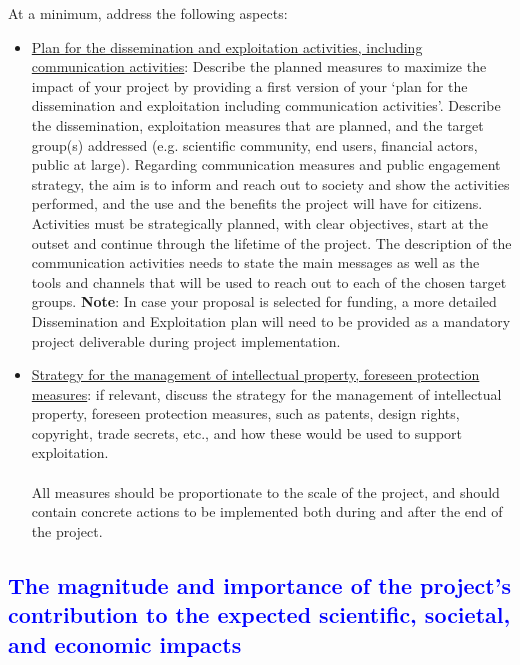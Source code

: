 \documentclass[11pt,a4paper]{article}
\begin{document}
\color{gray}
At a minimum, address the following aspects:
\begin{itemize}
    \item \underline{Plan for the dissemination and exploitation activities, including communication activities}: Describe the planned measures to maximize the impact of your project by providing a first version of your ‘plan for the dissemination and exploitation including communication activities’. Describe the dissemination, exploitation measures that are planned, and the target group(s) addressed (e.g. scientific community, end users, financial actors, public at large). Regarding communication measures and public engagement strategy, the aim is to inform and reach out to society and show the activities performed, and the use and the benefits the project will have for citizens. Activities must be strategically planned, with clear objectives, start at the outset and continue through the lifetime of the project. The description of the communication activities needs to state the main messages as well as the tools and channels that will be used to reach out to each of the chosen target groups. \textbf{Note}: In case your proposal is selected for funding, a more detailed Dissemination and Exploitation plan will need to be provided as a mandatory project deliverable during project implementation.
    \item \underline{Strategy for the management of intellectual property, foreseen protection measures}: if relevant, discuss the strategy for the management of intellectual property, foreseen protection measures, such as patents, design rights, copyright, trade secrets, etc., and how these would be used to support exploitation.\\
    \\
     	All measures should be proportionate to the scale of the project, and should contain concrete actions to be implemented both during and after the end of the project.
\end{itemize}
\color{black}


\textcolor{Blue}{\subsection{The magnitude and importance of the project's contribution to the expected scientific, societal, and economic impacts}}
\end{document}
